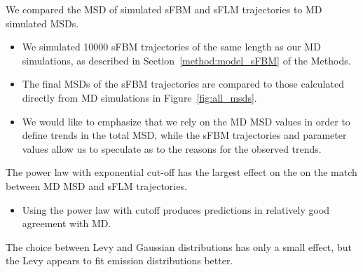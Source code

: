 \documentclass{article}
\begin{document}
  \noindent We compared the MSD of simulated sFBM and sFLM trajectories to MD simulated
  MSDs.
  \begin{itemize}
	\item We simulated 10000 sFBM trajectories of the same length as our MD
	simulations, as described in Section~\ref{method:model_sFBM} of the Methods.
	\item The final MSDs of the sFBM trajectories are compared to those 
	calculated directly from MD simulations in Figure~\ref{fig:all_msds}. 
	\item We would like to emphasize that we rely on the MD MSD values in order to
	define trends in the total MSD, while the sFBM trajectories and parameter 
	values allow us to speculate as to the reasons for the observed trends. 
  \end{itemize}
  
  
  \noindent The power law with exponential cut-off has the largest effect on the on 
  the match between MD MSD and sFLM trajectories.
  \begin{itemize}
    \item Using the power law with cutoff produces predictions in relatively good agreement
    with MD.
  \end{itemize}
  
  \noindent The choice between Levy and Gaussian distributions has only a small effect, 
  but the Levy appears to fit emission distributions better.
\end{document}
